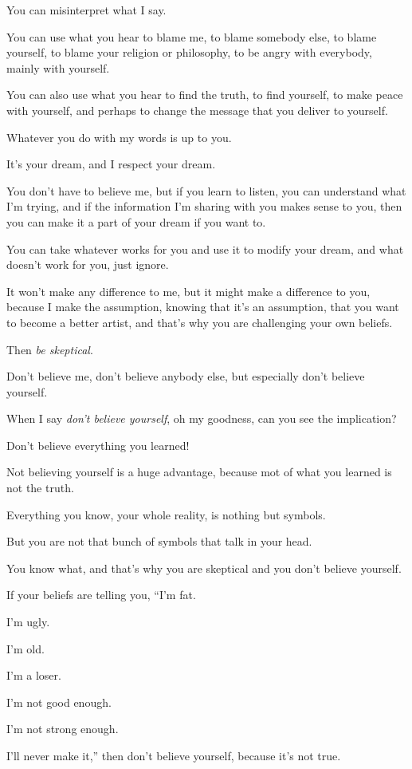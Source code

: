 \documentclass{article}
\numberwithin{equation}{section}
\begin{document}
You can misinterpret what I say.

You can use what you hear to blame me, to blame somebody else, to blame yourself, to blame your religion or philosophy, to be angry with everybody, mainly with yourself.

You can also use what you hear to find the truth, to find yourself, to make peace with yourself, and perhaps to change the message that you deliver to yourself.

%
Whatever you do with my words is up to you.

It's your dream, and I respect your dream.

You don't have to believe me, but if you learn to listen, you can understand what I'm trying, and if the information I'm sharing with you makes sense to you, then you can make it a part of your dream if you want to.

You can take whatever works for you and use it to modify your dream, and what doesn't work for you, just ignore.

It won't make any difference to me, but it might make a difference to you, because I make the assumption, knowing that it's an assumption, that you want to become a better artist, and that's why you are challenging your own beliefs.

%
Then \textit{be skeptical}.

Don't believe me, don't believe anybody else, but especially don't believe yourself.

When I say \textit{don't believe yourself}, oh my goodness, can you see the implication?

Don't believe everything you learned!

Not believing yourself is a huge advantage, because mot of what you learned is not the truth.

Everything you know, your whole reality, is nothing but symbols.

But you are not that bunch of symbols that talk in your head.

You know what, and that's why you are skeptical and you don't believe yourself.

%
If your beliefs are telling you, ``I'm fat.

I'm ugly.

I'm old.

I'm a loser.

I'm not good enough.

I'm not strong enough.

I'll never make it,'' then don't believe yourself, because it's not true.
\end{document}

